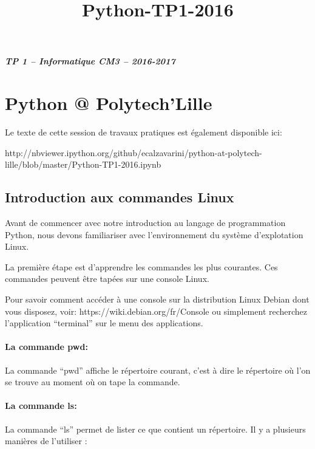 \documentclass{article}
\title{Python-TP1-2016}
\begin{document}
    
    \date{} 
    \maketitle
    
    

    
    \subparagraph{TP 1 -- Informatique CM3 --
2016-2017}\label{tp-1-informatique-cm3-2016-2017}

    \section{Python @ Polytech'Lille}\label{python-polytechlille}

    Le texte de cette session de travaux pratiques est également disponible
ici:

http://nbviewer.ipython.org/github/ecalzavarini/python-at-polytech-lille/blob/master/Python-TP1-2016.ipynb

    \subsection{Introduction aux commandes
Linux}\label{introduction-aux-commandes-linux}

    Avant de commencer avec notre introduction au langage de programmation
Python, nous devons familiariser avec l'environnement du système
d'explotation Linux.

La première étape est d'apprendre les commandes les plus courantes. Ces
commandes peuvent être tapées sur une console Linux.

Pour savoir comment accéder à une console sur la distribution Linux
Debian dont vous disposez, voir: https://wiki.debian.org/fr/Console ou
simplement recherchez l'application ``terminal'' sur le menu des
applications.

    \paragraph{La commande pwd:}\label{la-commande-pwd}

    La commande ``pwd'' affiche le répertoire courant, c'est à dire le
répertoire où l'on se trouve au moment où on tape la commande.

    \paragraph{La commande ls:}\label{la-commande-ls}

    La commande ``ls'' permet de lister ce que contient un répertoire. Il y
a plusieurs manières de l'utiliser :
\end{document}
